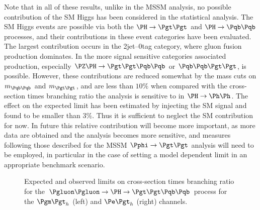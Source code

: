 Note that in all of these results, unlike in the \ac{MSSM} analysis, no possible
contribution of the \ac{SM} Higgs has been considered in the statistical
analysis. The \ac{SM} Higgs events are possible via both the $\PH\to\Pgt\Pgt$
and $\PH\to\Pqb\Pqb$ processes, and their contributions in these event
categories have been evaluated. The largest contribution occurs in the
2jet--0tag category, where gluon fusion production dominates. In the more signal
sensitive categories associated production, especially
$\PZ\PH\to\Pgt\Pgt\Pqb\Pqb$ or $\Pqb\Pqb\Pgt\Pgt$, is possible. 
However, these contributions are
reduced somewhat by the mass cuts on $m_{\Pqb\Pqb}$ and $m_{\Pgt\Pgt}$, and 
are less than $10\%$ when compared with the cross-section times branching ratio
the analysis is sensitive to in $\PH\to\Ph\Ph$. The effect on the expected limit
has been estimated by injecting the \ac{SM} signal and found to be smaller than
$3\%$. Thus it is sufficient to neglect the \ac{SM} contribution for now. In
future this relative contribution will become more important, as more data are
obtained and the analysis becomes more sensitive, and measures following those
described for the \ac{MSSM} $\Pphi\to\Pgt\Pgt$ analysis will need to be
employed, in particular in the case of setting a model dependent limit in an
appropriate benchmark scenario. 

\begin{figure}
\begin{center}

\end{center}
\caption{
Expected and observed limits on cross-section times branching ratio for the
$\Pgluon\Pgluon\to\PH\to\Pgt\Pgt\Pqb\Pqb$ process for the $\mutau$ (left) and
$\etau$ (right) channels.}
\label{fig:Hhhlimits}
\end{figure} 

